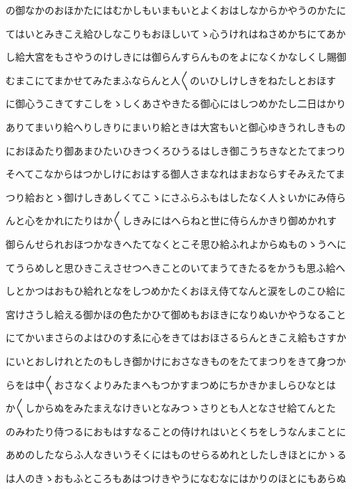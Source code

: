 \documentclass[a4paper,11pt,landscape]{ltjtarticle}
\begin{document}
\par\medskip
の御なかのおほかたにはむかしもいまもいとよくおはしなからかやうのかたに
\par\medskip
てはいとみきこえ給ひしなこりもおほしいてゝ心うけれはねさめかちにてあか
\par\medskip
し給大宮をもさやうのけしきには御らんすらんものをよになくかなしくし賜御
\par\medskip
むまこにてまかせてみたまふならんと人〱のいひしけしきをねたしとおほす
\par\medskip
に御心うこきてすこしをゝしくあさやきたる御心にはしつめかたし二日はかり
\par\medskip
ありてまいり給へりしきりにまいり給ときは大宮もいと御心ゆきうれしきもの
\par\medskip
におほゐたり御あまひたいひきつくろひうるはしき御こうちきなとたてまつり
\par\medskip
そへてこなからはつかしけにおはする御人さまなれはまおならすそみえたてま
\par\medskip
つり給おとゝ御けしきあしくてこゝにさふらふもはしたなく人〻いかにみ侍ら
\par\medskip
んと心をかれにたりはか〱しきみにはへらねと世に侍らんかきり御めかれす
\par\medskip
御らんせられおほつかなきへたてなくとこそ思ひ給ふれよからぬものゝうへに
\par\medskip
てうらめしと思ひきこえさせつへきことのいてまうてきたるをかうも思ふ給へ
\par\medskip
しとかつはおもひ給れとなをしつめかたくおほえ侍てなんと涙をしのこひ給に
\par\medskip
宮けさうし給える御かほの色たかひて御めもおほきになりぬいかやうなること
\par\medskip
にてかいまさらのよはひのすゑに心をきてはおほさるらんときこえ給もさすか
\par\medskip
にいとおしけれとたのもしき御かけにおさなきものをたてまつりをきて身つか
\par\medskip
らをは中〱おさなくよりみたまへもつかすまつめにちかきかましらひなとは
\par\medskip
か〱しからぬをみたまえなけきいとなみつゝさりとも人となさせ給てんとた
\par\medskip
のみわたり侍つるにおもはすなることの侍けれはいとくちをしうなんまことに
\par\medskip
あめのしたならふ人なきいうそくにはものせらるめれとしたしきほとにかゝる
\par\medskip
は人のきゝおもふところもあはつけきやうになむなにはかりのほとにもあらぬ
\par\medskip
\end{document}
